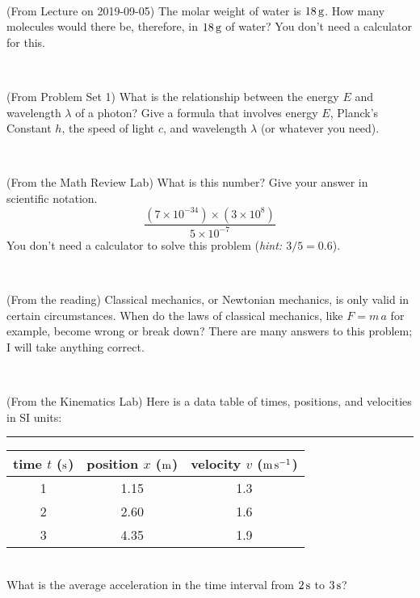\documentclass[12pt, letterpaper]{article}
\begin{document}
\vfill ~

\begin{problem} (From Lecture on 2019-09-05)
The molar weight of water is $18\,\mathrm{g}$. How many molecules would there
be, therefore, in $18\,\mathrm{g}$ of water? You don't need a calculator for
this.
\end{problem}


\vfill ~

\begin{problem} (From Problem Set 1)
What is the relationship between the energy $E$ and wavelength
$\lambda$ of a photon? Give a formula that involves energy $E$,
Planck's Constant $h$, the speed of light $c$, and wavelength
$\lambda$ (or whatever you need).
\end{problem}

\vfill ~


\clearpage


\begin{problem} (From the Math Review Lab)
What is this number? Give your answer in scientific notation.
$$
\frac{(7\times10^{-34})\times(3\times10^8)}{5\times10^{-7}}
$$
You don't need a calculator to solve this problem (\textit{hint: $3/5=0.6$}).
\end{problem}


\vfill ~

\begin{problem} (From the reading)
Classical mechanics, or Newtonian mechanics, is only valid in certain
circumstances. When do the laws of classical mechanics, like $F =
m\,a$ for example, become wrong or break down? There are many answers
to this problem; I will take anything correct.
\end{problem}


\vfill ~

\begin{problem} (From the Kinematics Lab)
Here is a data table of times, positions, and velocities in SI units:\\
\rule{1.0in}{0pt}\begin{tabular}{c|c|c}
time $t$ ($\mathrm{s}$) & position $x$ ($\mathrm{m}$) & velocity $v$ ($\mathrm{m}\,\mathrm{s}^{-1}$) \\
\hline
1 & 1.15 & 1.3 \\
2 & 2.60 & 1.6 \\
3 & 4.35 & 1.9 \\
\hline
\end{tabular}\\
What is the average acceleration in the time interval from $2\,\mathrm{s}$ to $3\,\mathrm{s}$?
\end{problem}
\end{document}

